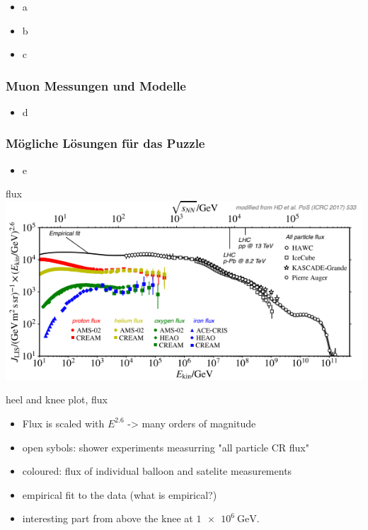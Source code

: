 \documentclass[aspectratio=1610, 9pt]{beamer}
\begin{document}
\begin{frame}\frametitle{}
  \begin{itemize}
    \item a
    \item b
    \item c
  \end{itemize}
\end{frame}

\begin{frame}\frametitle{Muon Messungen und Modelle}
  \begin{itemize}
    \item d
  \end{itemize}
\end{frame}

\begin{frame}\frametitle{M\"ogliche L\"osungen f\"ur das Puzzle}
  \begin{itemize}
    \item e
  \end{itemize}
\end{frame}

\begin{frame}{flux}
  \includegraphics[width=\textwidth]{knee_heel.png}
\end{frame}

\begin{frame}{heel and knee plot, flux}
  \begin{itemize}
    \item Flux is scaled with $E^{2.6}$ -> many orders of magnitude
    \item open sybols: shower experiments measurring "all particle CR flux"
    \item coloured: flux of individual balloon and satelite measurements
    \item empirical fit to the data (what is empirical?)
    \item interesting part from above the knee at $\SI{1e6}{\giga\electronvolt}$.
  \end{itemize}
\end{frame}
\end{document}
